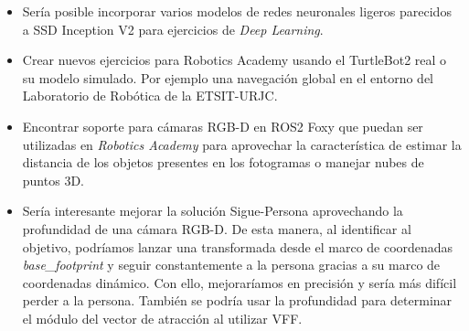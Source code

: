 \begin{itemize}
	\item Sería posible incorporar varios modelos de redes neuronales ligeros parecidos a SSD Inception V2 para ejercicios de \textit{Deep Learning}.
	\item Crear nuevos ejercicios para Robotics Academy usando el TurtleBot2 real o su modelo simulado. Por ejemplo una navegación global en el entorno del Laboratorio de Robótica de la ETSIT-URJC.
	\item Encontrar soporte para cámaras RGB-D en ROS2 Foxy que puedan ser utilizadas en \textit{Robotics Academy} para aprovechar la característica de estimar la distancia de los objetos presentes en los fotogramas o manejar nubes de puntos 3D.
	\item Sería interesante mejorar la solución Sigue-Persona aprovechando la profundidad de una cámara RGB-D. De esta manera, al identificar al objetivo, podríamos lanzar una transformada desde el marco de coordenadas \textit{base\_footprint} y seguir constantemente a la persona gracias a su marco de coordenadas dinámico. Con ello, mejoraríamos en precisión y sería más difícil perder a la persona. También se podría usar la profundidad para determinar el módulo del vector de atracción al utilizar VFF.
\end{itemize}

